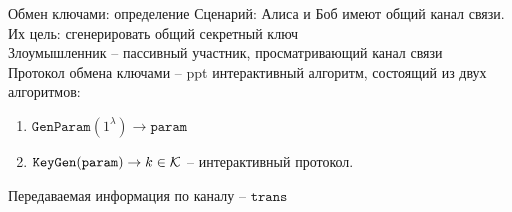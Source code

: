 \documentclass[usenames,dvipsnames,8pt,aspectratio=169]{beamer}
\begin{document}
\begin{frame}{Обмен ключами: определение}
\Large
\vspace{-40pt}
{\color{Orange} Сценарий:} Алиса и Боб имеют общий канал связи. Их цель: сгенерировать общий секретный ключ \\[10pt]

{\color{Orange} Злоумышленник } -- пассивный участник, просматривающий канал связи \\[20pt]


Протокол {\color{Orange} обмена ключами} -- ppt интерактивный алгоритм, состоящий из двух алгоритмов: \\
\begin{enumerate}
	\item $\mathtt{GenParam}(1^\lambda) \rightarrow \mathtt{param}$ 
	\item $\mathtt{KeyGen}(\mathtt{param}) \rightarrow k \in \mathcal{K}$ -- интерактивный протокол. \\
	
\end{enumerate} 

Передаваемая информация по каналу -- $\mathtt{trans}$
	
\end{frame}
\end{document}

